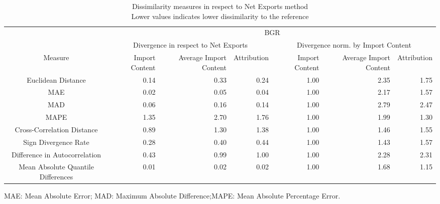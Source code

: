 \begin{table}[t]
\caption*{
{\large Dissimilarity measures in respect to Net Exports method} \\ 
{\small Lower values indicates lower dissimilarity to the reference}
} 
\fontsize{15.0pt}{18.0pt}\selectfont
\begin{tabular*}{\linewidth}{@{\extracolsep{\fill}}crrrrrr}
\toprule
 & \multicolumn{6}{c}{BGR} \\ 
\cmidrule(lr){2-7}
 & \multicolumn{3}{c}{Divergence in respect to Net Exports} & \multicolumn{3}{c}{Divergence norm. by Import Content} \\ 
\cmidrule(lr){2-4} \cmidrule(lr){5-7}
Measure & Import Content & Average Import Content & Attribution & Import Content & Average Import Content & Attribution \\ 
\midrule\addlinespace[2.5pt]
Euclidean Distance & 0.14 & 0.33 & 0.24 & 1.00 & 2.35 & 1.75 \\ 
MAE & 0.02 & 0.05 & 0.04 & 1.00 & 2.17 & 1.57 \\ 
MAD & 0.06 & 0.16 & 0.14 & 1.00 & 2.79 & 2.47 \\ 
MAPE & 1.35 & 2.70 & 1.76 & 1.00 & 1.99 & 1.30 \\ 
Cross-Correlation Distance & 0.89 & 1.30 & 1.38 & 1.00 & 1.46 & 1.55 \\ 
Sign Divergence Rate & 0.28 & 0.40 & 0.44 & 1.00 & 1.43 & 1.57 \\ 
Difference in Autocorrelation & 0.43 & 0.99 & 1.00 & 1.00 & 2.28 & 2.31 \\ 
Mean Absolute Quantile Differences & 0.01 & 0.02 & 0.02 & 1.00 & 1.68 & 1.15 \\ 
\bottomrule
\end{tabular*}
\begin{minipage}{\linewidth}
MAE: Mean Absolute Error; MAD: Maximum Absolute Difference;MAPE: Mean Absolute Percentage Error.\\
\end{minipage}
\end{table}

